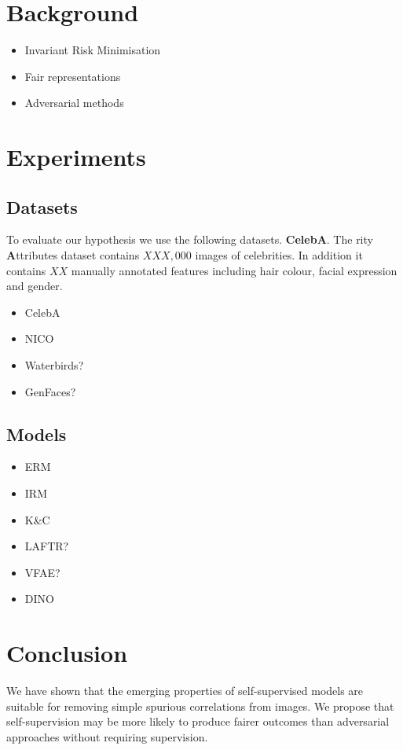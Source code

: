 \documentclass{bmvc2k}
\begin{document}
\section{Background}
\label{sec:background}

\begin{itemize}
    \item Invariant Risk Minimisation
    \item Fair representations
    \item Adversarial methods
\end{itemize}

\section{Experiments}
\label{sec:experiments}

\subsection{Datasets}
\label{sec:datasets}
To evaluate our hypothesis we use the following datasets.
\textbf{CelebA}. The rity \textbf{A}ttributes dataset contains $XXX,000$ images of celebrities.
In addition it contains $XX$ manually annotated features including hair colour, facial expression and gender.

\begin{itemize}
    \item CelebA
    \item NICO
    \item Waterbirds?
    \item GenFaces?
\end{itemize}

\subsection{Models}
\label{sec:models}

\begin{itemize}
    \item ERM
    \item IRM
    \item K\&C
    \item LAFTR?
    \item VFAE?
    \item DINO
\end{itemize}


\section{Conclusion}
\label{sec:conclusion}

We have shown that the emerging properties of self-supervised models are suitable for removing simple spurious correlations from images.
We propose that self-supervision may be more likely to produce fairer outcomes than adversarial approaches without requiring supervision.



\end{document}
